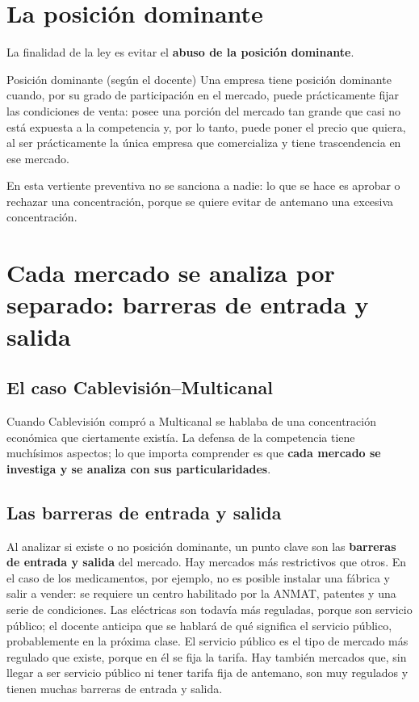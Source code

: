 \documentclass[12pt,oneside]{book}
\begin{document}
\section{La posición dominante}

La finalidad de la ley es evitar el \textbf{abuso de la posición dominante}.

\begin{definition}{Posición dominante (según el docente)}
Una empresa tiene posición dominante cuando, por su grado de participación en el mercado, puede prácticamente fijar las condiciones de venta: posee una porción del mercado tan grande que casi no está expuesta a la competencia y, por lo tanto, puede poner el precio que quiera, al ser prácticamente la única empresa que comercializa y tiene trascendencia en ese mercado.
\end{definition}

En esta vertiente preventiva no se sanciona a nadie: lo que se hace es aprobar o rechazar una concentración, porque se quiere evitar de antemano una excesiva concentración.

\section{Cada mercado se analiza por separado: barreras de entrada y salida}

\subsection{El caso Cablevisión--Multicanal}

Cuando Cablevisión compró a Multicanal se hablaba de una concentración económica que ciertamente existía. La defensa de la competencia tiene muchísimos aspectos; lo que importa comprender es que \textbf{cada mercado se investiga y se analiza con sus particularidades}.

\subsection{Las barreras de entrada y salida}

Al analizar si existe o no posición dominante, un punto clave son las \textbf{barreras de entrada y salida} del mercado. Hay mercados más restrictivos que otros. En el caso de los medicamentos, por ejemplo, no es posible instalar una fábrica y salir a vender: se requiere un centro habilitado por la ANMAT, patentes y una serie de condiciones. Las eléctricas son todavía más reguladas, porque son servicio público; el docente anticipa que se hablará de qué significa el servicio público, probablemente en la próxima clase. El servicio público es el tipo de mercado más regulado que existe, porque en él se fija la tarifa. Hay también mercados que, sin llegar a ser servicio público ni tener tarifa fija de antemano, son muy regulados y tienen muchas barreras de entrada y salida.
\end{document}
